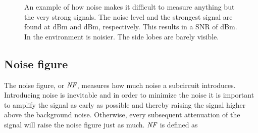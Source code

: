 			\begin{figure}[hb!!!]
				\centering 
				\caption[Example of signal plus noise.]{ An example of how noise makes it difficult to measure anything but the very strong signals. The noise level and the strongest signal are found at \unit[20]{dBm} and \unit[87]{dBm}, respectively. This results in a SNR of \unit[67]{dBm}. In  the environment is noisier. The side lobes are barely visible.}\label{fig:noise_example}
			\end{figure}
		
		\subsection{Noise figure}
			The noise figure, or $\emph{NF}$, measures how much noise a subcircuit introduces. Introducing noise is inevitable and in order to minimize the noise it is important to amplify the signal as early as possible and thereby raising the signal higher above the background noise. Otherwise, every subsequent attenuation of the signal will raise the noise figure just as much. $\emph{NF}$ is defined as
			
